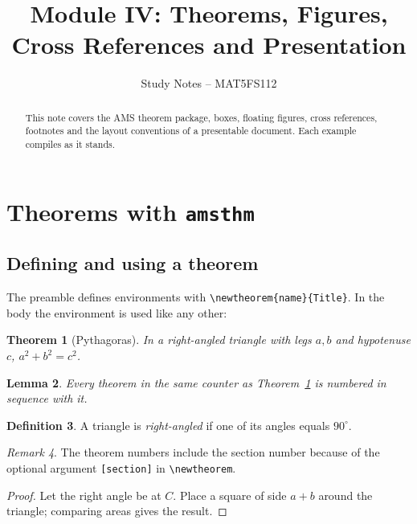 \documentclass[11pt,a4paper]{article}
\title{Module IV: Theorems, Figures, Cross References and Presentation}
\author{Study Notes -- MAT5FS112}
\date{}
\theoremstyle{plain}                         %
\newtheorem{theorem}{Theorem}[section]       %
\newtheorem{lemma}[theorem]{Lemma}           %
\theoremstyle{definition}                    %
\newtheorem{definition}[theorem]{Definition}
\theoremstyle{remark}                        %
\newtheorem{remark}[theorem]{Remark}
\begin{document}
\maketitle

\begin{abstract}
This note covers the AMS theorem package, boxes, floating figures,
cross references, footnotes and the layout conventions of a
presentable document. Each example compiles as it stands.
\end{abstract}

\tableofcontents
\listoffigures
\newpage

\section{Theorems with \texttt{amsthm}}
\label{sec:theorems}

\subsection{Defining and using a theorem}

The preamble defines environments with \verb|\newtheorem{name}{Title}|.
In the body the environment is used like any other:

\begin{theorem}[Pythagoras]\label{thm:pyth}
In a right-angled triangle with legs $a, b$ and hypotenuse $c$,
$a^2 + b^2 = c^2$.
\end{theorem}

\begin{lemma}
Every theorem in the same counter as Theorem~\ref{thm:pyth} is numbered
in sequence with it.
\end{lemma}

\begin{definition}
A triangle is \emph{right-angled} if one of its angles equals $90^\circ$.
\end{definition}

\begin{remark}
The theorem numbers include the section number because of the optional
argument \texttt{[section]} in \verb|\newtheorem|.
\end{remark}

\begin{proof}
Let the right angle be at $C$. Place a square of side $a+b$ around the
triangle; comparing areas gives the result. \qedhere
\end{proof}
\end{document}
